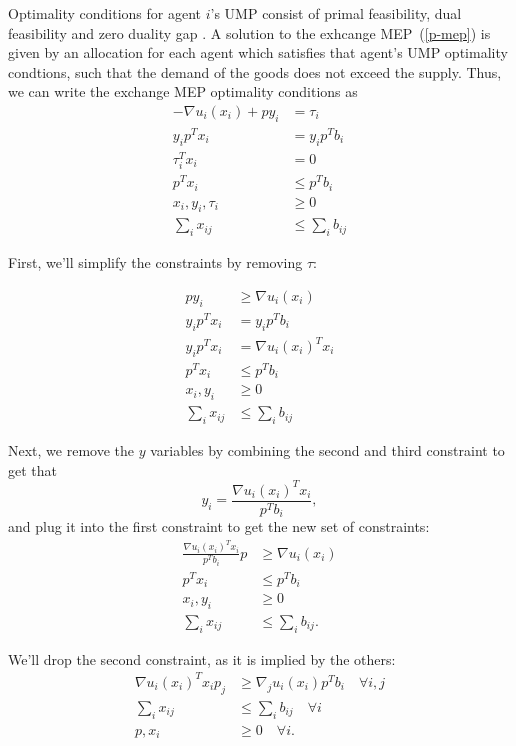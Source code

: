\documentclass[12pt]{article}
\begin{document}
Optimality conditions for agent $i$'s UMP consist of primal feasibility, dual
feasibility and zero duality gap \cite{BoV:04}.
A solution to the exhcange MEP~(\ref{p-mep})
is given by an allocation for each agent which satisfies that
agent's UMP optimality condtions, such that the demand of the goods
does not exceed the supply.
Thus, we can write the exchange MEP optimality conditions as
\begin{align*}
-\nabla u_i(x_i) + p y_i &= \tau_i\\
y_i p^T x_i &= y_i p^T b_i \\
\tau_i^T x_i &= 0\\
p^T x_i &\leq p^T b_i\\
x_i, y_i, \tau_i &\geq 0\\
\sum_{i} x_{ij} &\leq \sum_{i} b_{ij}
\end{align*}

First, we'll simplify the constraints by removing $\tau$:

\begin{align*}
p y_i &\geq \nabla u_i(x_i) \\
y_i p^T x_i &= y_i p^T b_i \\
y_i p^T x_i &= \nabla u_i(x_i)^T x_i\\
p^T x_i &\leq p^T b_i\\
x_i, y_i &\geq 0\\
\sum_{i} x_{ij} &\leq \sum_{i} b_{ij}
\end{align*}

Next, we remove the $y$ variables by combining the second and third constraint
to get that
\[
y_i = \frac{\nabla u_i(x_i)^T x_i}{p^T b_i},
\]
and plug it into the first constraint to get the new set of constraints:
\begin{align*}
\frac{\nabla u_i(x_i)^T x_i}{p^T b_i} p &\geq \nabla u_i(x_i) \\
p^T x_i &\leq p^T b_i\\
x_i, y_i &\geq 0\\
\sum_{i} x_{ij} &\leq \sum_{i} b_{ij}.
\end{align*}

We'll drop the second constraint, as it is implied by the others:
\begin{align*}
\nabla u_i(x_i)^T x_i p_j &\geq \nabla_j u_i(x_i) p^T b_i\quad \forall i,j \\
\sum_{i} x_{ij} &\leq \sum_{i} b_{ij}\quad \forall i\\
p, x_i &\geq 0\quad \forall i.
\end{align*}
\end{document}
